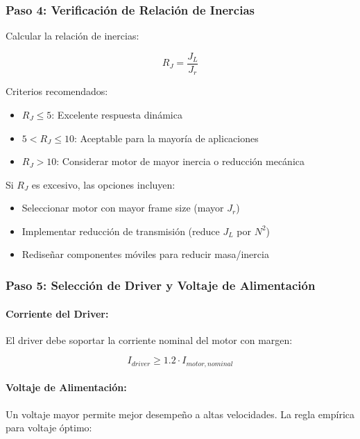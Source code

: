 \subsubsection{Paso 4: Verificación de Relación de Inercias}

Calcular la relación de inercias:

\begin{equation}
R_J = \frac{J_L}{J_r}
\end{equation}

Criterios recomendados:
\begin{itemize}
    \item $R_J \leq 5$: Excelente respuesta dinámica
    \item $5 < R_J \leq 10$: Aceptable para la mayoría de aplicaciones
    \item $R_J > 10$: Considerar motor de mayor inercia o reducción mecánica
\end{itemize}

Si $R_J$ es excesivo, las opciones incluyen:
\begin{itemize}
    \item Seleccionar motor con mayor frame size (mayor $J_r$)
    \item Implementar reducción de transmisión (reduce $J_L$ por $N^2$)
    \item Rediseñar componentes móviles para reducir masa/inercia
\end{itemize}

\subsubsection{Paso 5: Selección de Driver y Voltaje de Alimentación}

\paragraph{Corriente del Driver:}

El driver debe soportar la corriente nominal del motor con margen:

\begin{equation}
I_{driver} \geq 1.2 \cdot I_{motor,nominal}
\end{equation}

\paragraph{Voltaje de Alimentación:}

Un voltaje mayor permite mejor desempeño a altas velocidades. La regla empírica para voltaje óptimo:

